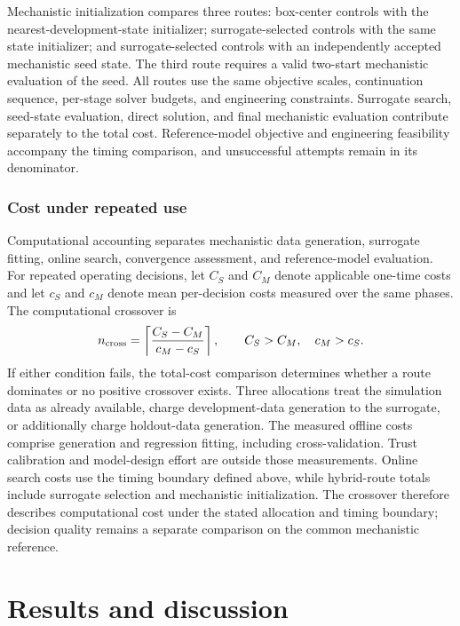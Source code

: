 \documentclass[a4paper,fleqn]{cas-sc}
\begin{document}
Mechanistic initialization compares three routes: box-center controls with the nearest-development-state initializer; surrogate-selected controls with the same state initializer; and surrogate-selected controls with an independently accepted mechanistic seed state. The third route requires a valid two-start mechanistic evaluation of the seed. All routes use the same objective scales, continuation sequence, per-stage solver budgets, and engineering constraints. Surrogate search, seed-state evaluation, direct solution, and final mechanistic evaluation contribute separately to the total cost. Reference-model objective and engineering feasibility accompany the timing comparison, and unsuccessful attempts remain in its denominator.

\subsubsection{Cost under repeated use}

Computational accounting separates mechanistic data generation, surrogate fitting, online search, convergence assessment, and reference-model evaluation. For repeated operating decisions, let $C_S$ and $C_M$ denote applicable one-time costs and let $c_S$ and $c_M$ denote mean per-decision costs measured over the same phases. The computational crossover is
\begin{equation}
 n_{\rm cross}=\left\lceil\frac{C_S-C_M}{c_M-c_S}\right\rceil,
 \qquad C_S>C_M,\quad c_M>c_S.
 \label{eq:amortization}
\end{equation}
If either condition fails, the total-cost comparison determines whether a route dominates or no positive crossover exists. Three allocations treat the simulation data as already available, charge development-data generation to the surrogate, or additionally charge holdout-data generation. The measured offline costs comprise generation and regression fitting, including cross-validation. Trust calibration and model-design effort are outside those measurements. Online search costs use the timing boundary defined above, while hybrid-route totals include surrogate selection and mechanistic initialization. The crossover therefore describes computational cost under the stated allocation and timing boundary; decision quality remains a separate comparison on the common mechanistic reference.

\section{Results and discussion}
\label{sec:results}
\end{document}
